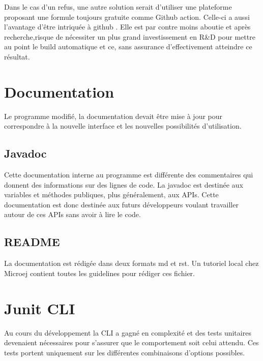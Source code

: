 \documentclass[french,a4paper,12pt]{report}
\begin{document}
Dans le cas d’un refus, une autre solution serait d’utiliser une plateforme proposant une formule toujours gratuite comme Github action. Celle-ci a aussi l’avantage d’être intriquée à github . Elle est par contre moins aboutie et après recherche,risque de nécessiter un plus grand investissement en R\&D pour mettre au  point le build automatique et ce, sans assurance d’effectivement atteindre ce résultat.

\section{Documentation}

Le programme modifié, la documentation devait être mise à jour pour correspondre à la nouvelle interface et les nouvelles possibilités d’utilisation.

\subsection{Javadoc}
Cette documentation interne au programme est différente des commentaires qui donnent des informations sur des lignes de code. La javadoc est destinée aux variables et méthodes publiques, plus généralement, aux APIs. Cette documentation est donc destinée aux futurs développeurs voulant travailler autour de ces APIs sans avoir à lire le code.

\subsection{README}

La documentation est rédigée dans deux formats md et rst. Un tutoriel local chez Microej contient toutes les guidelines pour rédiger ces fichier.

\section{Junit CLI}

Au cours du développement la CLI a gagné en complexité et des tests unitaires devenaient nécessaires pour s’assurer que le comportement soit celui attendu. Ces tests portent uniquement sur les différentes combinaisons d’options possibles. 
\end{document}
